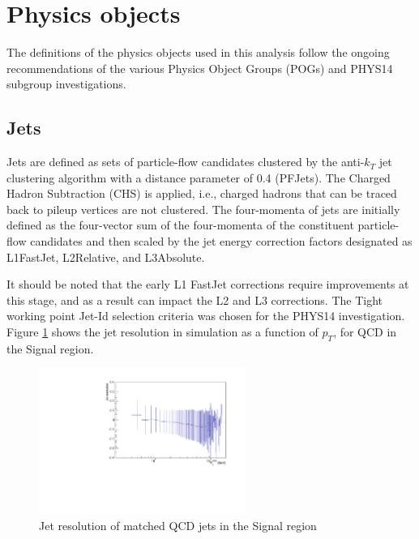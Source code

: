 \section{Physics objects}
\label{sec:objects}
The definitions of the physics objects used in this analysis follow the ongoing recommendations of the various Physics Object Groups (POGs) and PHYS14 subgroup investigations. 

\subsection{Jets}
\label{sec:jetreco}
Jets are defined as sets of particle-flow candidates clustered by the
anti-$k_{T}$ jet clustering algorithm with a distance parameter of 0.4
(PFJets). The Charged Hadron Subtraction (CHS) is applied, i.e., charged
hadrons that can be traced back to pileup vertices are not clustered.
The four-momenta of jets are initially defined as the four-vector sum of
the four-momenta of the constituent particle-flow candidates and then
scaled by the jet energy correction factors designated as L1FastJet,
L2Relative, and L3Absolute.

It should be noted that the early L1 FastJet corrections require
improvements at this stage, and as a result can impact the L2 and L3
corrections. The Tight working point Jet-Id selection criteria was
chosen for the PHYS14 investigation. Figure \ref{fig:QCDJets} shows the
jet resolution in simulation as a function of $p_{T}$, for QCD in the Signal region.

\begin{figure}[h]
  \centering
  \includegraphics[width=0.6\textwidth]{figures/PhysicsObjectsPlots/JetResolutionSigQCD.pdf}
  \caption{Jet resolution of matched QCD jets in the Signal region}
  \label{fig:QCDJets}
\end{figure}
   
  

